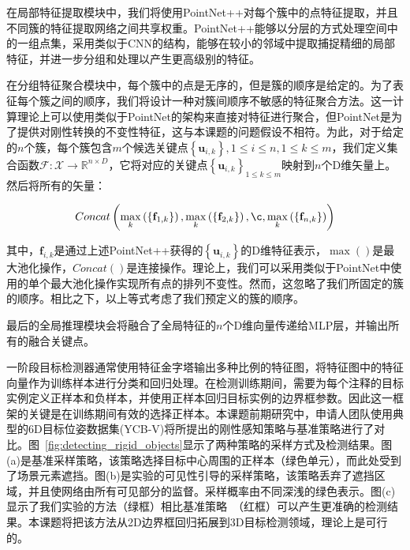 \documentclass[12pt]{article}
\begin{document}
在局部特征提取模块中，我们将使用PointNet++对每个簇中的点特征提取，并且不同簇的特征提取网络之间共享权重。PointNet++能够以分层的方式处理空间中的一组点集，采用类似于CNN的结构，能够在较小的邻域中提取捕捉精细的局部特征，并进一步分组和处理以产生更高级别的特征。

在分组特征聚合模块中，每个簇中的点是无序的，但是簇的顺序是给定的。为了表征每个簇之间的顺序，我们将设计一种对簇间顺序不敏感的特征聚合方法。这一计算理论上可以使用类似于PointNet的架构来直接对特征进行聚合，但PointNet是为了提供对刚性转换的不变性特征，这与本课题的问题假设不相符。为此，对于给定的$n$个簇，每个簇包含$m$个候选关键点$\left\{\mathbf{u}_{i,k}\right\}, 1 \leq i \leq n, 1 \leq k \leq m$，我们定义集合函数$\mathcal{F}: \mathcal{X} \rightarrow \mathbb{R}^{n × D}$，它将对应的关键点$\left\{\mathbf{u}_{i,k}\right\}_{1 \leq k \leq m}$映射到$n$个D维矢量上。然后将所有的矢量：

\begin{equation}
Concat\left(\underset{k}{\max}\left(\left\{\mathbf{f}_{1,k}\right\}\right), \underset{k}{\max}\left(\left\{\mathbf{f}_{2,k}\right\}\right), \c, \underset{k}{\max}\left(\left\{\mathbf{f}_{n,k}\right\}\right)\right)
\end{equation}

其中，$\mathbf{f}_{i,k}$是通过上述PointNet++获得的$\left\{\mathbf{u}_{i,k}\right\}$的D维特征表示，$\max()$是最大池化操作，$Concat()$是连接操作。理论上，我们可以采用类似于PointNet中使用的单个最大池化操作实现所有点的排列不变性。然而，这忽略了我们所固定的簇的顺序。相比之下，以上等式考虑了我们预定义的簇的顺序。

最后的全局推理模块会将融合了全局特征的$n$个D维向量传递给MLP层，并输出所有的融合关键点。

一阶段目标检测器通常使用特征金字塔输出多种比例的特征图，将特征图中的特征向量作为训练样本进行分类和回归处理。在检测训练期间，需要为每个注释的目标实例定义正样本和负样本，并使用正样本回归目标实例的边界框参数。因此这一框架的关键是在训练期间有效的选择正样本。本课题前期研究中，申请人团队使用典型的6D目标位姿数据集(YCB-V)将所提出的刚性感知策略与基准策略进行了对比。图~\ref{fig:detecting_rigid_objects}显示了两种策略的采样方式及检测结果。图(a)是基准采样策略，该策略选择目标中心周围的正样本（绿色单元），而此处受到了场景元素遮挡。图(b)是实验的可见性引导的采样策略，该策略丢弃了遮挡区域，并且使网络由所有可见部分的监督。采样概率由不同深浅的绿色表示。图(c)显示了我们实验的方法（绿框）相比基准策略~\cite{Zhang2020}（红框）可以产生更准确的检测结果。本课题将把该方法从2D边界框回归拓展到3D目标检测领域，理论上是可行的。
\end{document}
